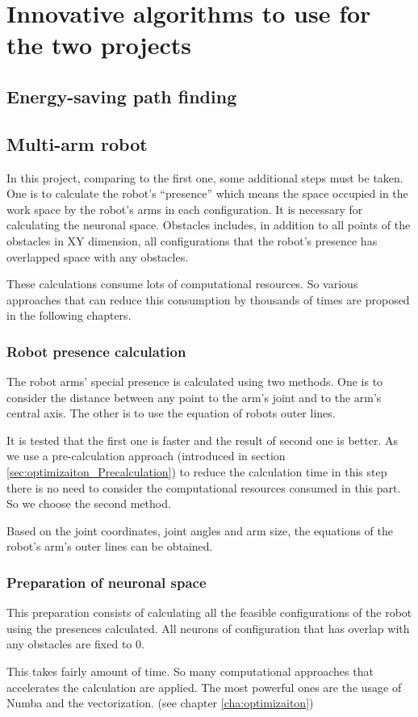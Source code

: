 \chapter{Innovative algorithms to use for the two projects}
\label{cha:algorithm}

\section{Energy-saving path finding}
\label{sec:algorithm_project1}

\section{Multi-arm robot}
\label{sec:algorithm_project2}
In this project, comparing to the first one, some additional steps must be taken.
One is to calculate the robot’s “presence” which means the space occupied in the work space by the robot’s arms in each configuration.
It is necessary for calculating the neuronal space.
Obstacles includes, in addition to all points of the obstacles in XY dimension,
all configurations that the robot’s presence has overlapped space with any obstacles.

These calculations consume lots of computational resources.
So various approaches that can reduce this consumption by thousands of times are proposed in the following chapters.

\subsection{Robot presence calculation}
\label{ssec:algorithm_presence}
The robot arms’ special presence is calculated using two methods.
One is to consider the distance between any point to the arm’s joint and to the arm’s central axis.
The other is to use the equation of robots outer lines.

It is tested that the first one is faster and the result of second one is better.
As we use a pre-calculation approach (introduced in section \ref{sec:optimizaiton_Precalculation}) to reduce the calculation time
in this step there is no need to consider the computational resources consumed in this part.
So we choose the second method.

Based on the joint coordinates, joint angles and arm size, the equations of the robot's arm's outer lines can be obtained.

\subsection{Preparation of neuronal space}
\label{ssec:algorithm_project2_space}
This preparation consists of calculating all the feasible configurations of the robot using the presences calculated.
All neurons of configuration that has overlap with any obstacles are fixed to 0.

This takes fairly amount of time.
So many computational approaches that accelerates the calculation are applied.
The most powerful ones are the usage of Numba and the vectorization. (see chapter \ref{cha:optimizaiton})
